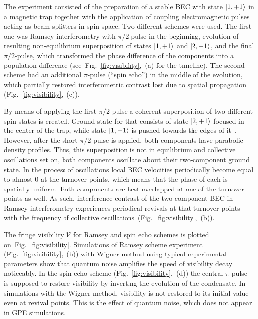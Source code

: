 \documentclass[aps,prl,twocolumn,showpacs,amsmath,amssymb,superscriptaddress]{revtex4-1}
\newcommand{\figref}[1]{Fig.~\ref{#1}}
\newcommand{\ket}[1]{\mbox{\ensuremath{| #1 \rangle}}}
\begin{document}
The experiment consisted of the preparation of a stable BEC with state $\ket{1,+1}$ in a magnetic trap
together with the application of coupling electromagnetic pulses acting as beam-splitters in spin-space.
Two different schemes were used.
The first one was Ramsey interferometry with $\pi/2$-pulse in the beginning,
evolution of resulting non-equilibrium superposition of states $\ket{1,+1}$ and $\ket{2,-1}$,
and the final $\pi/2$-pulse, which transformed the phase difference of the components
into a population difference (see~\figref{fig:visibility},~(a) for the timeline).
The second scheme had an additional $\pi$-pulse (``spin echo'') in the middle of the evolution,
which partially restored interferometric contrast lost due to spatial propagation
(\figref{fig:visibility},~(c)).

By means of applying the first $\pi/2$ pulse a coherent superposition of two different spin-states is created.
Ground state for that consists of state $\ket{2,+1}$ focused in the center of the trap,
while state $\ket{1,-1}$ is pushed towards the edges of it~\cite{Mertes2007}.
However, after the short $\pi/2$ pulse is applied, both components have parabolic density profiles.
Thus, this superposition is not in equilibrium and collective oscillations set on,
both components oscillate about their two-component ground state.
In the process of oscillations local BEC velocities periodically become equal to almost $0$ at the turnover points,
which means that the phase of each is spatially uniform.
Both components are best overlapped at one of the turnover points as well.
As such, interference contrast of the two-component BEC in Ramsey interferometry experiences periodical revivals at that
turnover points with the frequency of collective oscillations~(\figref{fig:visibility},~(b)).

The fringe visibility $\mathcal{V}$ for Ramsey and spin echo schemes is plotted on~\figref{fig:visibility}.
Simulations of Ramsey scheme experiment (\figref{fig:visibility},~(b)) with Wigner method
using typical experimental parameters
show that quantum noise amplifies the speed of visibility decay noticeably.
In the spin echo scheme (\figref{fig:visibility},~(d)) the central $\pi$-pulse is supposed
to restore visibility by inverting the evolution of the condensate.
In simulations with the Wigner method, visibility is not restored to its initial value even at revival points.
This is the effect of quantum noise, which does not appear in GPE simulations.
\end{document}
